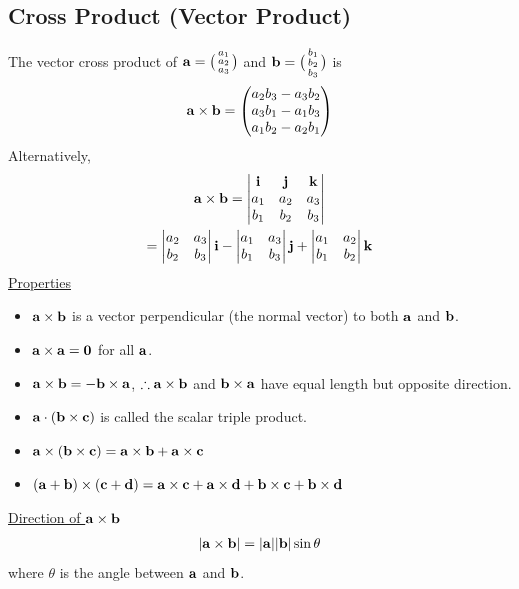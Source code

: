 \documentclass[10pt, a4paper, titlepage]{article}
\begin{document}
\begin{multicols*}{3}
	\subsection{Cross Product (Vector Product)}
	The vector cross product of $\vb{a}=\big(\begin{smallmatrix}a_1 \\a_2 \\a_3 \end{smallmatrix}\big)$
	and $\vb{b}=\big(\begin{smallmatrix}b_1 \\b_2 \\b_3 \end{smallmatrix}\big)$ is
	\begin{align}
		\vb{a}\times\vb{b}=\begin{pmatrix}a_2b_3-a_3b_2\\ a_3b_1-a_1b_3 \\a_1b_2-a_2b_1\end{pmatrix}
	\end{align}
	Alternatively,
	\begin{gather}
		\vb{a}\times\vb{b}=\begin{vmatrix}\vb{i} & \vb{j} & \vb{k} \\ a_1 & a_2 & a_3 \\ b_1 & b_2 & b_3\end{vmatrix}\\
		=\begin{vmatrix}a_2 & a_3 \\ b_2 & b_3\end{vmatrix}\vb{i}-\begin{vmatrix}a_1 & a_3 \\ b_1 & b_3\end{vmatrix}\vb{j}+\begin{vmatrix}a_1 & a_2 \\ b_1 & b_2\end{vmatrix}\vb{k}
	\end{gather}
	\underline{Properties}
	\begin{itemize}
		\item $\vb{a}\times\vb{b}$ is a vector perpendicular (the normal vector) to both $\vb{a}$ and $\vb{b}$.
		\item $\vb{a}\times\vb{a}=\vb{0}$ for all $\vb{a}$.
		\item $\vb{a}\times\vb{b}=-\vb{b}\times\vb{a}$, $\therefore\vb{a}\times\vb{b}$ and $\vb{b}\times\vb{a}$ have equal length but opposite direction.
		\item $\vb{a}\cdot(\vb{b}\times\vb{c})$ is called the scalar triple product.
		\item $\vb{a}\times(\vb{b}\times\vb{c})=\vb{a}\times\vb{b}+\vb{a}\times\vb{c}$
		\item $(\vb{a}+\vb{b})\times(\vb{c}+\vb{d})\\=\vb{a}\times\vb{c}+\vb{a}\times\vb{d}+\vb{b}\times\vb{c}+\vb{b}\times\vb{d}$
	\end{itemize}
	\underline{Direction of $\vb{a}\times\vb{b}$}
	\begin{align}
		|\vb{a}\times\vb{b}|=|\vb{a}||\vb{b}|\sin{\theta}
	\end{align}
	where $\theta$ is the angle between $\vb{a}$ and $\vb{b}$.


\end{multicols*}
\end{document}
